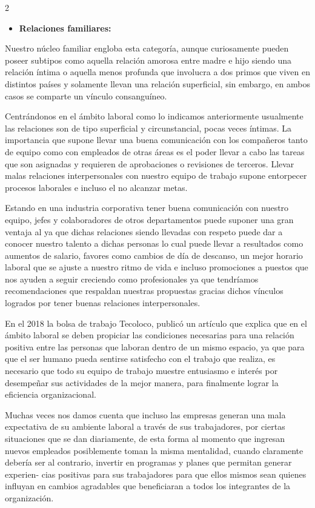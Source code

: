 \documentclass[12pt,spanish,Letterpaper,openany]{book}
\providecommand{\tightlist}{%
  \setlength{\itemsep}{0pt}\setlength{\parskip}{0pt}}
\begin{document}
\begin {multicols}{2}
\begin{itemize}
\tightlist
\item
  \textbf{Relaciones familiares:}
\end{itemize}

Nuestro núcleo familiar engloba esta categoría, aunque curiosamente pueden poseer subtipos como aquella relación amorosa entre madre e hijo siendo una relación íntima o aquella menos profunda que involucra a dos primos que viven en distintos países y solamente llevan una relación superficial, sin embargo, en ambos casos se comparte un vínculo consanguíneo.

Centrándonos en el ámbito laboral como lo indicamos anteriormente usualmente las relaciones son de tipo superficial y circunstancial, pocas veces íntimas. La importancia que supone llevar una buena comunicación con los compañeros tanto de equipo como con empleados de otras áreas es el poder llevar a cabo las tareas que son asignadas y requieren de aprobaciones o revisiones de terceros. Llevar malas relaciones interpersonales con nuestro equipo de trabajo supone entorpecer procesos laborales e incluso el no alcanzar metas.

Estando en una industria corporativa tener buena comunicación con nuestro equipo, jefes y colaboradores de otros departamentos puede suponer una gran ventaja al ya que dichas relaciones siendo llevadas con respeto puede dar a conocer nuestro talento a dichas personas lo cual puede llevar a resultados como aumentos de salario, favores como cambios de día de descanso, un mejor horario laboral que se ajuste a nuestro ritmo de vida e incluso promociones a puestos que nos ayuden a seguir creciendo como profesionales ya que tendríamos recomendaciones que respaldan nuestras propuestas gracias dichos vínculos logrados por tener buenas relaciones interpersonales.

En el 2018 la bolsa de trabajo Tecoloco, publicó un artículo que explica que en el ámbito laboral se deben propiciar las condiciones necesarias para una relación positiva entre las personas que laboran dentro de un mismo espacio, ya que para que el ser humano pueda sentirse satisfecho con el trabajo que realiza, es necesario que todo su equipo de trabajo muestre entusiasmo e interés por desempeñar sus actividades de la mejor manera, para finalmente lograr la eficiencia organizacional.

Muchas veces nos damos cuenta que incluso las empresas generan una mala expectativa de su ambiente laboral a través de sus trabajadores, por ciertas situaciones que se dan diariamente, de esta forma al momento que ingresan nuevos empleados posiblemente toman la misma mentalidad, cuando claramente debería ser al contrario, invertir en programas y planes que permitan generar experien-
cias positivas para sus trabajadores para que ellos mismos sean quienes influyan en cambios agradables que beneficiaran a todos los integrantes de la organización.


\end{multicols}
\end{document}
